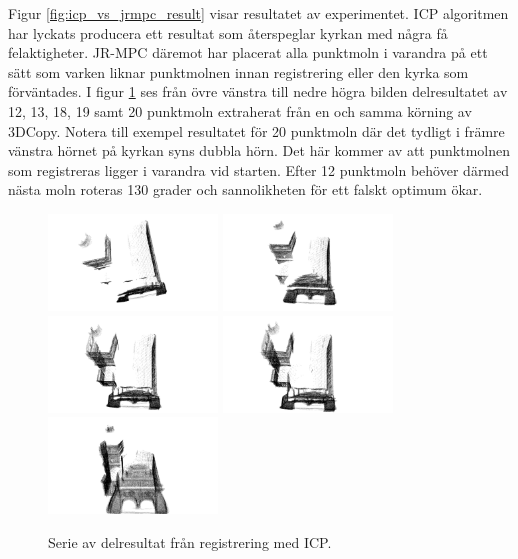 Figur \ref{fig:icp_vs_jrmpc_result} visar resultatet av experimentet. ICP algoritmen har lyckats producera ett resultat som återspeglar kyrkan med några få felaktigheter. JR-MPC däremot har placerat alla punktmoln i varandra på ett sätt som varken liknar punktmolnen innan registrering eller den kyrka som förväntades. I figur \ref{fig:registered_church_serie} ses från övre vänstra till nedre högra bilden delresultatet av 12, 13, 18, 19 samt 20 punktmoln extraherat från en och samma körning av 3DCopy. Notera till exempel resultatet för 20 punktmoln där det tydligt i främre vänstra hörnet på kyrkan syns dubbla hörn. Det här kommer av att punktmolnen som registreras ligger i varandra vid starten. Efter 12 punktmoln behöver därmed nästa moln roteras 130 grader och sannolikheten för ett falskt optimum ökar.
\begin{figure}[H]
	\centering
	\includegraphics[width=45mm]{figures/12_pc.png}
	\includegraphics[width=45mm]{figures/13_pc.png}
	\includegraphics[width=45mm]{figures/18_pc.png}
	\includegraphics[width=45mm]{figures/19_pc.png}
	\includegraphics[width=45mm]{figures/20_pc.png}
	\caption{Serie av delresultat från registrering med ICP.}
	\label{fig:registered_church_serie}
\end{figure}

